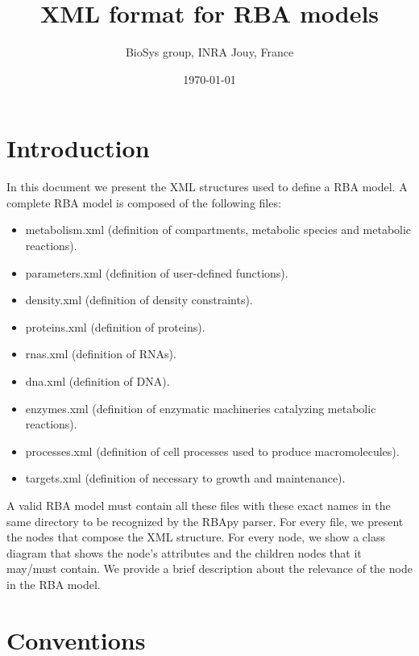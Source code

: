 \documentclass[12pt]{scrartcl}
\begin{document}
\title{XML format for RBA models}
\author{BioSys group, INRA Jouy, France}
\date{\today}

\maketitle

\newpage

\tableofcontents

\newpage

\section{Introduction}

In this document we present the XML structures used to define a RBA model.
A complete RBA model is composed of the following files:
\begin{itemize}
  \item metabolism.xml
  (definition of compartments, metabolic species and metabolic reactions).
  \item parameters.xml
  (definition of user-defined functions).
  \item density.xml (definition of density constraints).
  \item proteins.xml (definition of proteins).
  \item rnas.xml (definition of RNAs).
  \item dna.xml (definition of DNA).
  \item enzymes.xml
  (definition of enzymatic machineries catalyzing metabolic reactions).
  \item processes.xml
  (definition of cell processes used to produce macromolecules).
  \item targets.xml
  (definition of  necessary to growth and maintenance).
\end{itemize}

A valid RBA model must contain all these files with these exact names in
the same directory to be recognized by the RBApy parser.
For every file, we present the nodes that compose the XML structure.
For every node, we show a class diagram that shows the node's attributes
and the children nodes that it may/must contain.
We provide a brief description about the relevance of the node
in the RBA model.


\section{Conventions}
\end{document}
